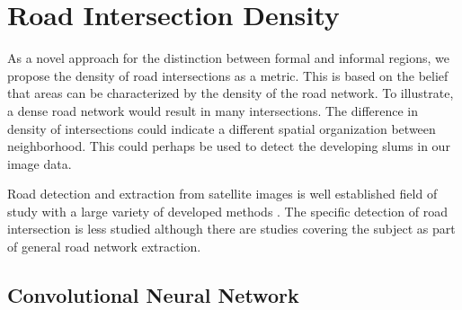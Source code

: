\section{Road Intersection Density}

%

As a novel approach for the distinction between formal and informal regions, we
propose the density of road intersections as a metric. This is based on the belief that areas can be characterized by the density of the road network. To illustrate, a dense road network would result in many intersections. The difference in density of intersections could indicate a different spatial organization between neighborhood. This could perhaps be used to detect the developing slums in our image data.

Road detection and extraction from satellite images is well established field of study with a large variety of developed methods \cite{mena2003state}.  The specific detection of road intersection is less studied although there are studies covering the subject \cite{hu2007road} \cite{koutaki2004automatic} as part of general road network extraction. 

\subsection{Convolutional Neural Network}

